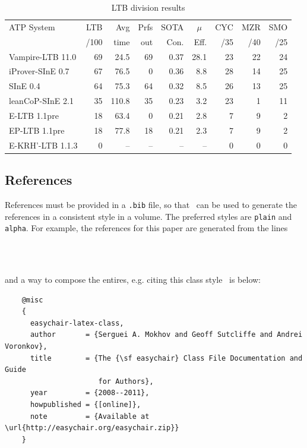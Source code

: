 \documentclass{easychair}
\begin{document}
\begin{table}[htp]
	\begin{centering}
		\begin{tabular}{lrrrrrrrr}
		\hline
		ATP System            & LTB & Avg  &Prfs & SOTA & \multicolumn{1}{c}{$\mu$} & CYC & MZR & SMO \\
		                      & /100& time & out & Con. & Eff. & /35 & /40 & /25 \\
		\hline
		Vampire-LTB 11.0      &  69 & 24.5 &  69 & 0.37 & 28.1 &  23 &  22 &  24 \\
		iProver-SInE 0.7      &  67 & 76.5 &   0 & 0.36 &  8.8 &  28 &  14 &  25 \\
		SInE 0.4              &  64 & 75.3 &  64 & 0.32 &  8.5 &  26 &  13 &  25 \\
		leanCoP-SInE 2.1      &  35 &110.8 &  35 & 0.23 &  3.2 &  23 &   1 &  11 \\
		E-LTB 1.1pre          &  18 & 63.4 &   0 & 0.21 &  2.8 &   7 &   9 &   2 \\
		EP-LTB 1.1pre         &  18 & 77.8 &  18 & 0.21 &  2.3 &   7 &   9 &   2 \\
		E-KRH'-LTB 1.1.3      &   0 &   -- &  -- &   -- &   -- &   0 &   0 &   0 \\
		\hline
		\end{tabular}
		\caption{LTB division results}
		\label{tab:ltbexample}
	\end{centering}
\end{table}

\subsection{References}
\label{sect:references}

References must be provided in a {\tt .bib} file, so that \BibTeX\ can
be used to generate the references in a consistent style in a volume.
The preferred styles are {\tt plain} and {\tt alpha}.
For example, the references for this paper are generated from the
lines
\begin{verbatim}
    
    
\end{verbatim}
and a way to compose the entires, e.g. citing this class style~\cite{easychair-latex-class}
is below:
\small
\begin{verbatim}
    @misc
    {
      easychair-latex-class,
      author       = {Serguei A. Mokhov and Geoff Sutcliffe and Andrei Voronkov},
      title        = {The {\sf easychair} Class File Documentation and Guide
                      for Authors},
      year         = {2008--2011},
      howpublished = {[online]},
      note         = {Available at \url{http://easychair.org/easychair.zip}}
    }
\end{verbatim}
\normalsize
\end{document}
